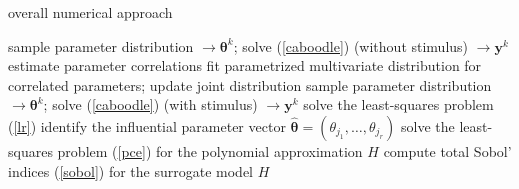 \begin{algorithm}
\caption{overall numerical approach}\label{algo}
\begin{algorithmic}[1]
 
\State sample parameter distribution  $\longrightarrow \boldsymbol{\theta}^k$; solve (\ref{caboodle}) (without stimulus) $\longrightarrow \mathbf y^k$
\EndFor
\State estimate parameter correlations
\State fit parametrized multivariate distribution for correlated parameters; update joint distribution 
\EndWhile
{} 
\State sample parameter distribution  $\longrightarrow \boldsymbol{\theta}^k$; solve (\ref{caboodle}) (with stimulus) $\longrightarrow \mathbf y^k$
\EndFor
{}
\State solve the least-squares problem (\ref{lr}) 
\State identify the influential parameter vector $\hat{\boldsymbol\theta} =   (\theta_{j_1}, \dots, \theta_{j_r})$  
\State solve the least-squares problem  (\ref{pce}) for the polynomial  approximation $H$ 
\State compute total Sobol' indices (\ref{sobol}) for the surrogate model $H$
\EndFor
\end{algorithmic}
\end{algorithm}




